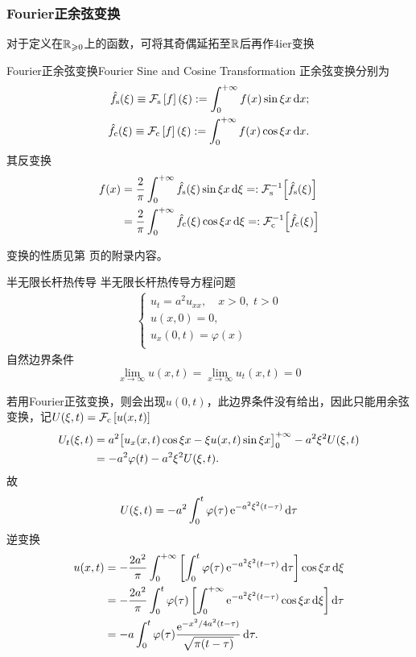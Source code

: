 \subsubsection{Fourier正余弦变换}
对于定义在$\RR_{\geqslant  0}$上的函数，可将其奇偶延拓至$\RR$后再作4ier变换
\begin{definition}{Fourier正余弦变换}{Fourier Sine and Cosine Transformation}
	正余弦变换分别为
	\begin{align*}
		\hat f_\sine(\xi)\equiv\cf[s]f(\xi):=\int\zti f(x)\sin\xi x\d x;\\
		\hat f_\cosi(\xi)\equiv\cf[c]f(\xi):=\int\zti f(x)\cos\xi x\d x.
	\end{align*}
	其反变换
	\begin{align*}
		f(x)&=\frac2\pi\int\zti\hat f_\sine(\xi)\sin\xi x\d\xi=:\cfi[s]{\hat f_\sine(\xi)}\\
		&=\frac2\pi\int\zti\hat f_\cosi(\xi)\cos\xi x\d\xi=:\cfi[c]{\hat f_\cosi(\xi)}
	\end{align*}
\end{definition}
变换的性质见第 \pageref{The Property of Sine and Cosine Transformation} 页的附录内容。
\begin{example}{半无限长杆热传导}{}
	半无限长杆热传导方程问题
	\begin{align*}
		\begin{cases}
			u_t=a^2u_{xx},\quad x>0,\;t>0\\
			u(x,0)=0,\\
			u_x(0,t)=\varphi(x)\\
		\end{cases}
	\end{align*}
	自然边界条件
	\[
		\lim_{x\to\infty}u(x,t)=\lim_{x\to\infty}u_t(x,t)=0
	\]
	
	若用Fourier正弦变换，则会出现$u(0,t)$，此边界条件没有给出，因此只能用余弦变换，记$U(\xi,t)=\cf[c]{u(x,t)}$
	\begin{align*}
		U_t(\xi,t)&=a^2\bigfkh{u_x(x,t)\cos\xi x-\xi u(x,t)\sin\xi x}\zti-a^2\xi^2U(\xi,t)\\
		&=-a^2\varphi(t)-a^2\xi^2U(\xi,t).
	\end{align*}
	故
	\[
		U(\xi,t)=-a^2\int_0^t\varphi(\tau)\e{-a^2\xi^2(t-\tau)}\d\tau
	\]
	逆变换
	\begin{align*}
		u(x,t)&=-\frac{2a^2}\pi\int\zti\fkh{\int_0^t\varphi(\tau)\e{-a^2\xi^2(t-\tau)}\d\tau}\cos\xi x\d\xi\\
		&=-\frac{2a^2}\pi\int_0^t\varphi(\tau)\fkh{\int\zti\e{-a^2\xi^2(t-\tau)}\cos\xi x\d\xi}\d\tau\\
		&=-a\int_0^t\varphi(\tau)\frac{\e{-x^2/4a^2(t-\tau)}}{\sqrt{\pi(t-\tau)}}\d\tau.
	\end{align*}
\end{example}

